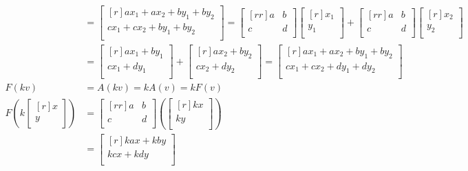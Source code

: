 \documentclass[12pt]{article}
\theoremstyle{definition}
\theoremstyle{plain}
\begin{document}
\begin{enumerate}
\begin{enumerate}
\begin{align*}
	 &= \begin{bmatrix}[r]ax_1+ax_2+by_1+by_2\\cx_1+cx_2+by_1+by_2\\\end{bmatrix} = \begin{bmatrix}[rr]a&b\\c&d\\\end{bmatrix}\begin{bmatrix}[r]x_1\\y_1\\\end{bmatrix}+\begin{bmatrix}[rr]a&b\\c&d\\\end{bmatrix}\begin{bmatrix}[r]x_2\\y_2\\\end{bmatrix}\\
	 &= \begin{bmatrix}[r]ax_1+by_1\\cx_1+dy_1\\\end{bmatrix}+\begin{bmatrix}[r]ax_2+by_2\\cx_2+dy_2\\\end{bmatrix} = \begin{bmatrix}[r]ax_1+ax_2+by_1+by_2\\cx_1+cx_2+dy_1+dy_2\\\end{bmatrix}\\
	F(kv)&=A(kv)=kA(v)=kF(v)\\
	F(k\begin{bmatrix}[r]x\\y\\\end{bmatrix}) &= \begin{bmatrix}[rr]a&b\\c&d\\\end{bmatrix}(\begin{bmatrix}[r]kx\\ky\\\end{bmatrix})\\
	&= \begin{bmatrix}[r]kax+kby\\kcx+kdy\\\end{bmatrix}\\

\end{align*}
\end{enumerate}
\end{enumerate}
\end{document}
